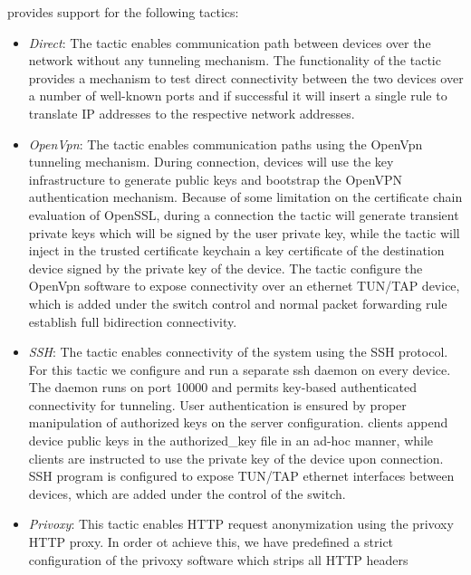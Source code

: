 \signpost provides support for the following tactics: 
\begin{itemize}
  \item \emph{Direct}: The tactic enables communication path between devices
        over the network without any tunneling mechanism. The functionality of
        the tactic  provides a mechanism to test direct connectivity between the
        two devices over a number of well-known ports and if successful it will
        insert a single \of rule to translate \signpost IP addresses to the
        respective network addresses. 
  \item \emph{OpenVpn}: The tactic enables communication paths using the OpenVpn
        tunneling mechanism. During connection,
        \signpost devices will use the \signpost key infrastructure to generate
        public keys and bootstrap the OpenVPN authentication mechanism.
        Because of some limitation on the certificate chain evaluation of
        OpenSSL, during a connection the tactic will generate transient private
        keys which will be signed by the user private key, while the tactic 
        will inject in the trusted certificate keychain a key certificate of the
        destination device signed by the private key of the device. The tactic
        configure the OpenVpn software to expose connectivity over an ethernet
        TUN/TAP device, which is added under the \of switch control and normal
        \of packet forwarding rule establish full bidirection connectivity.  
  \item \emph{SSH}:  The tactic enables connectivity of the system using the SSH
        protocol. For this tactic we configure and run a separate ssh daemon on
        every \signpost device. The daemon runs on port 10000 and permits
        key-based authenticated connectivity for tunneling.
        User authentication is ensured by proper manipulation of authorized keys
        on the server configuration. 
        \signpost clients append device public keys
        in the authorized\_key file in an ad-hoc manner, while clients are
        instructed to use the private key of the device upon connection. SSH
        program is configured to expose TUN/TAP ethernet interfaces between
        devices, which are added under the control of the \of switch.
  \item \emph{Privoxy}: This tactic enables HTTP request anonymization using 
    the privoxy HTTP proxy. In order ot achieve this, we have predefined a
    strict configuration of the privoxy software which strips all HTTP headers

\end{itemize}
